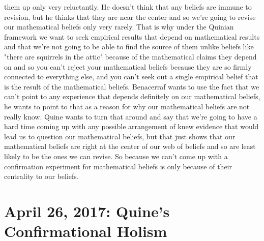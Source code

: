 \documentclass[12pt]{article}
\theoremstyle{definition}
\begin{document}
\begin{enumerate}
        them up only very reluctantly. He doesn't think that any beliefs are
        immune to revision, but he thinks that they are near the center and so
        we're going to revise our mathematical beliefs only very rarely. That
        is why under the Quinian framework we want to seek empirical results
        that depend on mathematical results and that we're not going to be able
        to find the source of them unlike beliefs like "there are squirrels in
        the attic" because of the mathematical claims they depend on and so you
        can't reject your mathematical beliefs because they are so firmly
        connected to everything else, and you can't seek out a single empirical
        belief that is the result of the mathematical beliefs. Benacerraf wants
        to use the fact that we can't point to any experience that depends
        definitely on our mathematical beliefs, he wants to point to that as a
        reason for why our mathematical beliefs are not really know. Quine
        wants to turn that around and say that we're going to have a hard time
        coming up with any possible arrangement of knew evidence that would
        lead us to question our mathematical beliefs, but that just shows that
        our mathematical beliefs are right at the center of our web of beliefs
        and so are least likely to be the ones we can revise. So because we
        can't come up with a confirmation experiment for mathematical beliefs
        is only because of their centrality to our beliefs.
\end{enumerate}

\section{April 26, 2017: Quine's Confirmational Holism}
\end{document}
